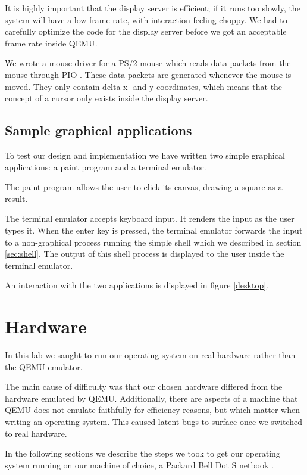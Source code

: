 \documentclass{report}
\begin{document}
It is highly important that the display server is efficient; if it runs too
slowly, the system will have a low frame rate, with interaction feeling
choppy. We had to carefully optimize the code for the display server before we
got an acceptable frame rate inside QEMU.

We wrote a mouse driver for a PS/2 mouse which reads data packets from the
mouse through PIO \cite{mouseinput}. These data packets are generated whenever
the mouse is moved. They only contain delta x- and y-coordinates, which means
that the concept of a cursor only exists inside the display server.


\section{Sample graphical applications}
To test our design and implementation we have written two simple graphical
applications: a paint program and a terminal emulator. 

The paint program allows the user to click its canvas, drawing a square as a
result.

The terminal emulator accepts keyboard input. It renders the input as the user
types it. When the enter key is pressed, the terminal emulator forwards the
input to a non-graphical process running the simple shell which we described
in section \ref{sec:shell}. The output of this shell process is displayed to
the user inside the terminal emulator.

An interaction with the two applications is displayed in figure \ref{desktop}.








\chapter{Hardware}
In this lab we saught to run our operating system on real hardware rather than
the QEMU emulator.

The main cause of difficulty was that our chosen hardware differed from the
hardware emulated by QEMU. Additionally, there are aspects of a machine that
QEMU does not emulate faithfully for efficiency reasons, but which matter when
writing an operating system. This caused latent bugs to surface once we
switched to real hardware.

In the following sections we describe the steps we took to get our operating
system running on our machine of choice, a Packard Bell Dot S netbook
\cite{netbook}.
\end{document}
